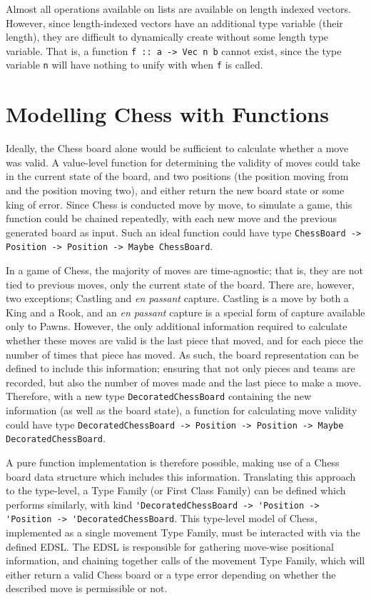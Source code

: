 \documentclass[12pt, a4paper, bibliography=totocnumbered]{scrreprt}
\newcommand{\inline}[1]{\lstinline[basicstyle=\ttfamily\footnotesize]{#1}}
\begin{document}
Almost all operations available on lists are available on length indexed vectors. However, since length-indexed vectors have an additional type variable (their length), they are difficult to dynamically create without some length type variable. That is, a function \inline{f :: a -> Vec n b} cannot exist, since the type variable \inline{n} will have nothing to unify with when \inline{f} is called.

\section{Modelling Chess with Functions}

Ideally, the Chess board alone would be sufficient to calculate whether a move was valid. A value-level function for determining the validity of moves could take in the current state of the board, and two positions (the position moving from and the position moving two), and either return the new board state or some king of error. Since Chess is conducted move by move, to simulate a game, this function could be chained repeatedly, with each new move and the previous generated board as input. Such an ideal function could have type \inline{ChessBoard -> Position -> Position -> Maybe ChessBoard}.

In a game of Chess, the majority of moves are time-agnostic; that is, they are not tied to previous moves, only the current state of the board. There are, however, two exceptions; Castling and \emph{en passant} capture. Castling is a move by both a King and a Rook, and an \emph{en passant} capture is a special form of capture available only to Pawns. However, the only additional information required to calculate whether these moves are valid is the last piece that moved, and for each piece the number of times that piece has moved. As such, the board representation can be defined to include this information; ensuring that not only pieces and teams are recorded, but also the number of moves made and the last piece to make a move. Therefore, with a new type \inline{DecoratedChessBoard} containing the new information (as well as the board state), a function for calculating move validity could have type \inline{DecoratedChessBoard -> Position -> Position -> Maybe DecoratedChessBoard}.

A pure function implementation is therefore possible, making use of a Chess board data structure which includes this information. Translating this approach to the type-level, a Type Family (or First Class Family) can be defined which performs similarly, with kind \inline{'DecoratedChessBoard -> 'Position -> 'Position -> 'DecoratedChessBoard}. This type-level model of Chess, implemented as a single movement Type Family, must be interacted with via the defined EDSL. The EDSL is responsible for gathering move-wise positional information, and chaining together calls of the movement Type Family, which will either return a valid Chess board or a type error depending on whether the described move is permissible or not.
\end{document}
